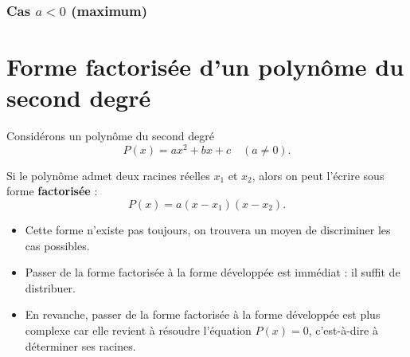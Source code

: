 \documentclass[french]{book}
\begin{document}
\begin{minipage}{0.48\textwidth}
\centering
{}
\end{minipage}
\hfill
\begin{minipage}{0.48\textwidth}
\subsubsection*{Cas $a<0$ (maximum)}

\centering
{}
\end{minipage}

\section{Forme factorisée d'un polynôme du second degré}

Considérons un polynôme du second degré 
\[
P(x) = ax^2 + bx + c \quad (a \neq 0).
\]

\begin{defn}
Si le polynôme admet deux racines réelles $x_1$ et $x_2$, alors on peut l’écrire sous forme \textbf{factorisée} :
\[
P(x) = a(x - x_1)(x - x_2).
\]

\end{defn}

\begin{rem}
\begin{itemize}
    \item Cette forme n’existe pas toujours, on trouvera un moyen de discriminer les cas possibles.
    \item Passer de la forme factorisée à la forme développée est immédiat : il suffit de distribuer.
    \item En revanche, passer de la forme factorisée à la forme développée est plus complexe car elle revient à résoudre l’équation $P(x) = 0$, c’est-à-dire à déterminer ses racines.
\end{itemize}
\end{rem}
\end{document}
